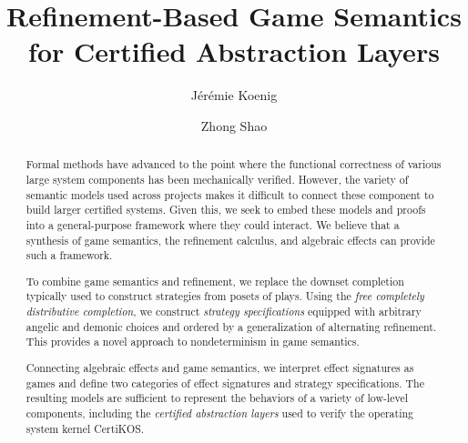 \documentclass[sigplan,screen]{acmart}
\newcommand{\gcat}{\mathcal{G}_{\sqsubseteq}}
\begin{document}
\pagestyle{empty}


\title{Refinement-Based Game Semantics for Certified Abstraction Layers} %

\author{J\'er\'emie Koenig}

\author{Zhong Shao}


\begin{abstract} %
Formal methods have advanced to the point where
the functional correctness of various large
system components has been mechanically verified.
However,
the variety of semantic models used across projects
makes it difficult to connect these component
to build larger certified systems.
Given this,
we seek to embed these models and proofs
into a general-purpose framework
where they could interact. %
We believe that a synthesis of game
semantics, the refinement calculus, and algebraic effects can
provide such a framework.

To combine game semantics and refinement, we replace the downset
completion typically used to construct strategies from posets of plays.
Using the \emph{free completely distributive completion},
we construct \emph{strategy specifications}
equipped with arbitrary angelic and demonic choices
and ordered by a generalization of alternating refinement.
This provides a novel approach to nondeterminism in game semantics.

Connecting algebraic effects and game semantics, we interpret effect
signatures as games and define two
categories %
of effect signatures and strategy
specifications.
The resulting models are sufficient to represent the behaviors
of a variety of low-level components,
including the \emph{certified abstraction layers}
used to verify the operating system
kernel CertiKOS. %
\end{abstract}
\end{document}
